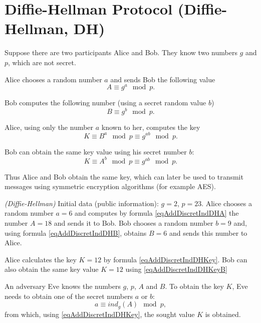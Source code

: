 \section{Diffie-Hellman Protocol (Diffie-Hellman, DH)}
\label{sec:add:dm:dh}
Suppose there are two participants Alice and Bob. They know two numbers
$g$ and $p$, which are not secret.

Alice chooses a random number $a$ and sends Bob the following value
\begin{equation}
A \equiv g^a \mod{p}.
\label{eqAddDiscretIndDHA}
\end{equation}

Bob computes the following number (using a secret random value
$b$)
\begin{equation}
B \equiv g^b \mod{p}.
\label{eqAddDiscretIndDHB}
\end{equation}

Alice, using only the number $a$ known to her, computes the key
\begin{equation}
K \equiv B^a\mod{p} \equiv g^{ab} \mod{p}.
\label{eqAddDiscretIndDHKey}
\end{equation}

Bob can obtain the same key value using his
secret number $b$:
\begin{equation}
K \equiv A^b\mod{p} \equiv g^{ab} \mod{p}.
\label{eqAddDiscretIndDHKeyB}
\end{equation}

Thus Alice and Bob obtain the same key, which can
later be used to transmit messages using
symmetric encryption algorithms (for example AES). 

\begin{example}
\emph{(Diffie-Hellman)}
Initial data (public information): $g = 2$, $p = 23$. Alice
chooses a random number $a = 6$ and computes by formula
\eqref{eqAddDiscretIndDHA} the number 
$A = 18$ and sends it to Bob.
Bob chooses a random number $b=9$ and, using formula 
\eqref{eqAddDiscretIndDHB}, obtains
$B = 6$ and sends this number to Alice.

Alice calculates the key 
$K = 12$ by formula \eqref{eqAddDiscretIndDHKey}. Bob can also obtain
the same key value 
$K = 12$ using \eqref{eqAddDiscretIndDHKeyB}
\nonumber
\end{example}

An adversary Eve knows the numbers $g$, $p$, $A$ and $B$. To obtain
the key $K$, Eve needs to obtain one of the secret numbers $a$ or $b$:
\begin{equation}
a \equiv ind_g\left( A \right) \mod{p},
\nonumber
\end{equation}
from which, using \eqref{eqAddDiscretIndDHKey}, the sought
value $K$ is obtained.
